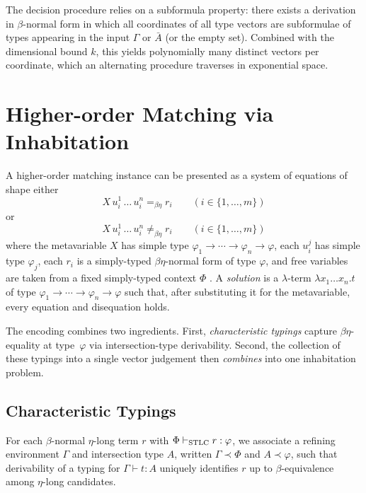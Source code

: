 \documentclass{easychair}
\theoremstyle{plain}%
\renewcommand{\:}{\mbox{:}\xspace}
\begin{document}
The decision procedure relies on a subformula property: there exists a derivation in $\beta$-normal form in which all coordinates of all type vectors are subformulae of types appearing in the input $\Gamma$ or $\bar{A}$ (or the empty set).
Combined with the dimensional bound $k$, this yields polynomially many distinct vectors per coordinate, which an alternating procedure traverses in exponential space.

\section{Higher-order Matching via Inhabitation}
\label{sect:homInh}

A higher-order matching instance can be presented as a system of equations of shape either
\begin{equation}\label{eq:hom}
X\,u_i^1\,\ldots\,u_i^n =_{\beta\eta} r_i \qquad (i \in \{1, \ldots, m\})
\end{equation}
or
\begin{equation}\label{neq:hom}
X\,u_i^1\,\ldots\,u_i^n \neq_{\beta\eta} r_i \qquad (i \in \{1, \ldots, m\})
\end{equation}
where the metavariable $X$ has simple type $\varphi_1 \to \cdots \to \varphi_n \to \varphi$, each $u_i^j$ has simple type $\varphi_j$, each $r_i$ is a simply-typed $\beta\eta$-normal form of type $\varphi$, and free variables are taken from a fixed simply-typed context $\Phi$ \cite{Padovani95}.
A \emph{solution} is a $\lambda$-term $\lambda x_1 \ldots x_n.t$ of type $\varphi_1 \to \cdots \to \varphi_n \to \varphi$ such that, after substituting it for the metavariable, every equation and disequation holds.

The encoding combines two ingredients.
First, \emph{characteristic typings} capture $\beta\eta$-equality at type~$\varphi$ via intersection-type derivability.
Second, the collection of these typings into a single vector judgement then \emph{combines} into one inhabitation problem.

\subsection{Characteristic Typings}

For each $\beta$-normal $\eta$-long term $r$ with $\Phi \vdash_{\textnormal{STLC}} r : \varphi$, we associate a refining environment $\Gamma$ and intersection type $A$, written $\Gamma \prec \Phi$ and $A \prec \varphi$, such that derivability of a typing for $\Gamma \vdash t : A$ uniquely identifies $r$ up to $\beta$-equivalence among $\eta$-long candidates.
\end{document}
